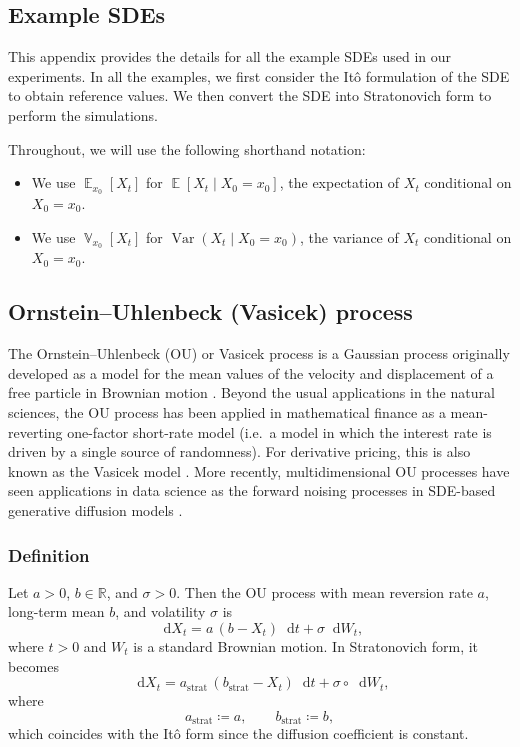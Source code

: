 \documentclass[11pt, letterpaper]{article}
\theoremstyle{definition}
\theoremstyle{remark}
\DeclareMathOperator{\E}{\mathbb{E}}
\DeclareMathOperator{\V}{\mathbb{V}}
\DeclareMathOperator{\var}{\mathrm{Var}}
\newcommand{\R}{\mathbb{R}}
\newcommand{\diff}{\mathop{}\!\mathrm{d}}
\begin{document}
\printbibliography
\begin{appendices}
    \setcounter{theorem}{0}
    \setcounter{lemma}{0}
\clearpage
\section{Example SDEs}\label{app:sdes}
This appendix provides the details for all the example SDEs used in our experiments.
In all the examples, we first consider the It\^{o} formulation of the SDE to obtain reference values. We then convert the SDE into Stratonovich form to perform the simulations.

Throughout, we will use the following shorthand notation:
\begin{itemize}
\item We use $\E_{x_0}[X_t]$ for $\E[X_t \mid X_0 = x_0]$, the expectation of $X_t$ conditional on $X_0 = x_0$.\medbreak
\item We use $\V_{x_0}[X_t]$ for $\var(X_t \mid X_0 = x_0)$, the variance of $X_t$ conditional on $X_0 = x_0$.\medbreak
\end{itemize}

\subsection{Ornstein--Uhlenbeck (Vasicek) process}\label{app:ou}
The Ornstein--Uhlenbeck (OU) or Vasicek process is a Gaussian process 
originally developed as a model for the mean values of the velocity and displacement of a free particle in Brownian motion \cite{ornstein1930}.
Beyond the usual applications in the natural sciences, the OU process has been applied in mathematical finance as a mean-reverting one-factor short-rate model (i.e.~a model in which the interest rate is driven by a single source of randomness).
For derivative pricing, this is also known as the Vasicek model \cite{vasicek1977}.
More recently, multidimensional OU processes have seen applications in data science as the forward noising processes in SDE-based generative diffusion models \cite{song2021scorebased}.

\subsubsection*{Definition}
Let $a > 0$, $b \in \R$, and $\sigma > 0$. Then the OU process with mean reversion rate $a$, long-term mean $b$, and volatility $\sigma$ is
\begin{equation}\label{eq:ou_ito}
    \diff X_t = a\,(b - X_t) \diff t + \sigma \diff W_t,
\end{equation}
where $t > 0$ and $W_t$ is a standard Brownian motion.
In Stratonovich form, it becomes
\begin{equation}\label{eq:ou_strat}
    \diff X_t = a_\text{strat}\,(b_\text{strat} - X_t) \diff t + \sigma \circ \diff W_t,
\end{equation}
where
\begin{equation*}
a_{\text{strat}} \coloneqq a,\qquad
  b_{\text{strat}} \coloneqq b,
\end{equation*}
which coincides with the It\^{o} form since the diffusion coefficient is constant.


\end{appendices}
\end{document}
